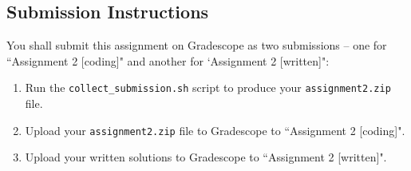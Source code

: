 \documentclass{article}
\begin{document}
\begin{enumerate}[label=(\alph*)]
\section{Submission Instructions}
You shall submit this assignment on Gradescope as two submissions -- one for ``Assignment 2 [coding]" and another for `Assignment 2 [written]":
\begin{enumerate}
    \item Run the \texttt{collect\_submission.sh} script to produce your \texttt{assignment2.zip} file.
    \item Upload your \texttt{assignment2.zip} file to Gradescope to ``Assignment 2 [coding]".
    \item Upload your written solutions to Gradescope to ``Assignment 2 [written]".
\end{enumerate}

\end{enumerate}
\end{document}
